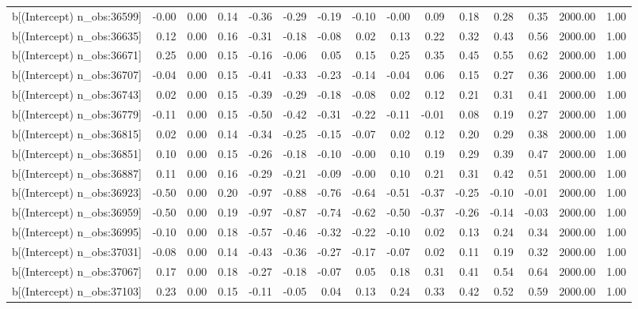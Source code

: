 \begin{table}[ht]
\begin{tabular}{rrrrrrrrrrrrrrr}
  b[(Intercept) n\_obs:36599] & -0.00 & 0.00 & 0.14 & -0.36 & -0.29 & -0.19 & -0.10 & -0.00 & 0.09 & 0.18 & 0.28 & 0.35 & 2000.00 & 1.00 \\ 
  b[(Intercept) n\_obs:36635] & 0.12 & 0.00 & 0.16 & -0.31 & -0.18 & -0.08 & 0.02 & 0.13 & 0.22 & 0.32 & 0.43 & 0.56 & 2000.00 & 1.00 \\ 
  b[(Intercept) n\_obs:36671] & 0.25 & 0.00 & 0.15 & -0.16 & -0.06 & 0.05 & 0.15 & 0.25 & 0.35 & 0.45 & 0.55 & 0.62 & 2000.00 & 1.00 \\ 
  b[(Intercept) n\_obs:36707] & -0.04 & 0.00 & 0.15 & -0.41 & -0.33 & -0.23 & -0.14 & -0.04 & 0.06 & 0.15 & 0.27 & 0.36 & 2000.00 & 1.00 \\ 
  b[(Intercept) n\_obs:36743] & 0.02 & 0.00 & 0.15 & -0.39 & -0.29 & -0.18 & -0.08 & 0.02 & 0.12 & 0.21 & 0.31 & 0.41 & 2000.00 & 1.00 \\ 
  b[(Intercept) n\_obs:36779] & -0.11 & 0.00 & 0.15 & -0.50 & -0.42 & -0.31 & -0.22 & -0.11 & -0.01 & 0.08 & 0.19 & 0.27 & 2000.00 & 1.00 \\ 
  b[(Intercept) n\_obs:36815] & 0.02 & 0.00 & 0.14 & -0.34 & -0.25 & -0.15 & -0.07 & 0.02 & 0.12 & 0.20 & 0.29 & 0.38 & 2000.00 & 1.00 \\ 
  b[(Intercept) n\_obs:36851] & 0.10 & 0.00 & 0.15 & -0.26 & -0.18 & -0.10 & -0.00 & 0.10 & 0.19 & 0.29 & 0.39 & 0.47 & 2000.00 & 1.00 \\ 
  b[(Intercept) n\_obs:36887] & 0.11 & 0.00 & 0.16 & -0.29 & -0.21 & -0.09 & -0.00 & 0.10 & 0.21 & 0.31 & 0.42 & 0.51 & 2000.00 & 1.00 \\ 
  b[(Intercept) n\_obs:36923] & -0.50 & 0.00 & 0.20 & -0.97 & -0.88 & -0.76 & -0.64 & -0.51 & -0.37 & -0.25 & -0.10 & -0.01 & 2000.00 & 1.00 \\ 
  b[(Intercept) n\_obs:36959] & -0.50 & 0.00 & 0.19 & -0.97 & -0.87 & -0.74 & -0.62 & -0.50 & -0.37 & -0.26 & -0.14 & -0.03 & 2000.00 & 1.00 \\ 
  b[(Intercept) n\_obs:36995] & -0.10 & 0.00 & 0.18 & -0.57 & -0.46 & -0.32 & -0.22 & -0.10 & 0.02 & 0.13 & 0.24 & 0.34 & 2000.00 & 1.00 \\ 
  b[(Intercept) n\_obs:37031] & -0.08 & 0.00 & 0.14 & -0.43 & -0.36 & -0.27 & -0.17 & -0.07 & 0.02 & 0.11 & 0.19 & 0.32 & 2000.00 & 1.00 \\ 
  b[(Intercept) n\_obs:37067] & 0.17 & 0.00 & 0.18 & -0.27 & -0.18 & -0.07 & 0.05 & 0.18 & 0.31 & 0.41 & 0.54 & 0.64 & 2000.00 & 1.00 \\ 
  b[(Intercept) n\_obs:37103] & 0.23 & 0.00 & 0.15 & -0.11 & -0.05 & 0.04 & 0.13 & 0.24 & 0.33 & 0.42 & 0.52 & 0.59 & 2000.00 & 1.00 \\ 

\end{tabular}
\end{table}
